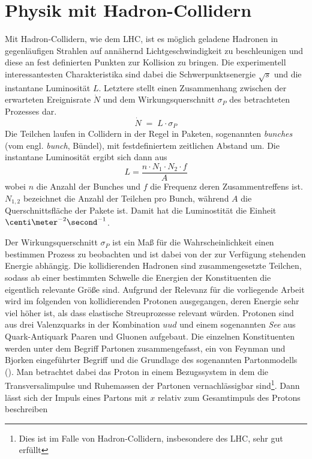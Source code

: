 \section{Physik mit Hadron-Collidern}
\label{theory:hadron_collider}


Mit Hadron-Collidern, wie dem \ac{LHC}, ist es möglich geladene Hadronen in
gegenläufigen Strahlen auf annähernd Lichtgeschwindigkeit zu beschleunigen und
diese an fest definierten Punkten zur Kollision zu bringen. Die experimentell
interessantesten Charakteristika sind dabei die Schwerpunktsenergie $\sqrt{s}$
und die instantane Luminosität $L$. Letztere stellt einen Zusammenhang zwischen
der erwarteten Ereignisrate $\dot N$ und dem Wirkungsquerschnitt $\sigma_P$ des
betrachteten Prozesses dar.
\begin{equation}
    \dot N \;=\; L \cdot \sigma_P
\end{equation}
Die Teilchen laufen in Collidern in der Regel in Paketen, sogenannten
\textit{bunches} (vom engl. \textit{bunch}, Bündel), mit festdefiniertem
zeitlichen Abstand um. Die instantane Luminosität ergibt sich dann aus
\begin{equation}
    L = \frac{n \cdot N_1 \cdot  N_2 \cdot f}{A}
\end{equation}
wobei $n$ die Anzahl der Bunches und $f$ die Frequenz deren Zusammentreffens
ist. $N_{1,2}$ bezeichnet die Anzahl der Teilchen pro Bunch, während $A$ die
Querschnittsfläche der Pakete ist. Damit hat die Luminostität die Einheit
$\centi\meter^{-2}\second^{-1}$.

Der Wirkungsquerschnitt $\sigma_P$ ist ein Maß für die Wahrscheinlichkeit einen
bestimmen Prozess zu beobachten und ist dabei von der zur Verfügung stehenden
Energie abhängig. Die kollidierenden Hadronen sind zusammengesetzte Teilchen,
sodass ab einer bestimmten Schwelle die Energien der Konstituenten die
eigentlich relevante Größe sind. Aufgrund der Relevanz für die vorliegende
Arbeit wird im folgenden von kollidierenden Protonen ausgegangen, deren Energie
sehr viel höher ist, als dass elastische Streuprozesse relevant würden.
Protonen sind aus drei Valenzquarks in der Kombination $uud$ und einem
sogenannten \textit{See} aus Quark-Antiquark Paaren und Gluonen aufgebaut. Die
einzelnen Konstituenten werden unter dem Begriff Partonen zusammengefasst, ein
von Feynman und Bjorken eingeführter Begriff und die Grundlage des sogenannten
Partonmodells (\cite{Bjorken:1968dy}). Man betrachtet dabei das Proton in einem
Bezugssystem in dem die Transversalimpulse und Ruhemassen der Partonen
vernachlässigbar sind\footnote{Dies ist im Falle von Hadron-Collidern,
insbesondere des \ac{LHC}, sehr gut erfüllt}. Dann lässt sich der Impuls eines
Partons mit $x$ relativ zum Gesamtimpuls des Protons beschreiben

